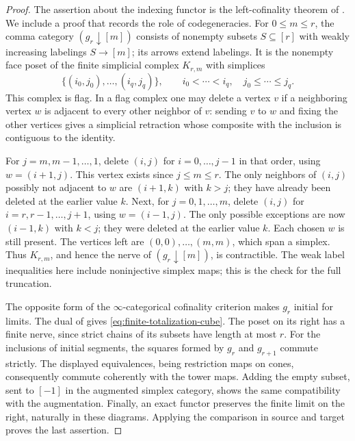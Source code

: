 \begin{proof}
The assertion about the indexing functor is the left-cofinality theorem
of \citet[Definitions~6.2--6.3 and Theorem~6.7]{Sinha09}.
We include a proof that records the role of codegeneracies.  For
$0\leq m\leq r$, the comma category $(g_r\downarrow[m])$ consists of
nonempty subsets $S\subseteq[r]$ with weakly increasing labelings
$S\to[m]$; its arrows extend labelings.  It is the nonempty face poset of
the finite simplicial complex $K_{r,m}$ with simplices
\[
 \{(i_0,j_0),\ldots,(i_q,j_q)\},\qquad
 i_0<\cdots<i_q,\quad j_0\leq\cdots\leq j_q.
\]
This complex is flag.  In a flag complex one may delete a vertex $v$
if a neighboring vertex $w$ is adjacent to every other neighbor of $v$:
sending $v$ to $w$ and fixing the other vertices gives a simplicial
retraction whose composite with the inclusion is contiguous to the identity.

For $j=m,m-1,\ldots,1$, delete $(i,j)$ for $i=0,\ldots,j-1$ in that
order, using $w=(i+1,j)$.  This vertex exists since $j\leq m\leq r$.
The only neighbors of $(i,j)$ possibly not adjacent to $w$ are
$(i+1,k)$ with $k>j$; they have already been deleted at the earlier
value $k$.  Next, for $j=0,1,\ldots,m$, delete $(i,j)$ for
$i=r,r-1,\ldots,j+1$, using $w=(i-1,j)$.  The only possible exceptions
are now $(i-1,k)$ with $k<j$; they were deleted at the earlier value
$k$.  Each chosen $w$ is still present.  The vertices left are
$(0,0),\ldots,(m,m)$, which span a simplex.  Thus $K_{r,m}$, and hence
the nerve of $(g_r\downarrow[m])$, is contractible.  The weak label
inequalities here include noninjective simplex maps; this is the check
for the full truncation.

The opposite form of the $\infty$-categorical cofinality criterion
\cite[Theorem~4.1.3.1]{Lurie09} makes $g_r$ initial for limits.
The dual of \cite[Proposition~4.1.1.8]{Lurie09} gives
\eqref{eq:finite-totalization-cube}.  The poset on its right has a
finite nerve, since strict chains of its subsets have length at most $r$.
For the inclusions of initial segments, the squares formed by $g_r$ and
$g_{r+1}$ commute strictly.  The displayed equivalences, being restriction
maps on cones, consequently commute coherently with the tower maps.
Adding the empty subset, sent to $[-1]$ in the augmented simplex category,
shows the same compatibility with the augmentation.  Finally, an exact
functor preserves the finite limit on the right, naturally in these diagrams.
Applying the comparison in source and target proves the last assertion.
\end{proof}


